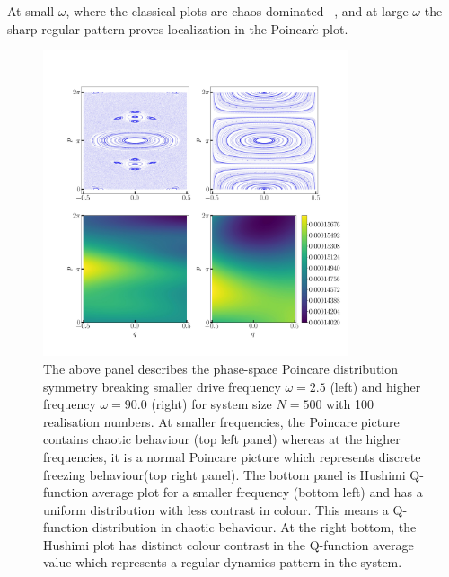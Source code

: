 \documentclass[%
reprint,
superscriptaddress,
amsmath,amssymb,
aps,
prb,
]{revtex4-2}
\begin{document}
	At small $\omega$, where the classical plots are chaos dominated ~\cite{Kidd2019}, and at large $\omega$ the sharp regular pattern proves localization in the Poincar$\acute{e}$ plot. 
	\begin{figure}[ht!]
		\centering
		\includegraphics[height = 9.0cm, width = 9.0 cm]{lmg_poincare.jpeg}
		\caption{The above panel describes the phase-space Poincare distribution symmetry breaking smaller drive frequency $\omega = 2.5$ (left) and higher frequency $\omega = 90.0$ (right) for system size $N=500$ with 100 realisation numbers. At smaller frequencies, the Poincare picture contains chaotic behaviour (top left panel) whereas at the higher frequencies, it is a normal Poincare picture which represents discrete freezing behaviour(top right panel). The bottom panel is Hushimi Q-function average plot for  a smaller frequency (bottom left) and has a uniform distribution with less contrast in colour. This means a Q-function distribution in chaotic behaviour. At the right bottom, the Hushimi plot has distinct colour contrast in the Q-function average value which represents a regular dynamics pattern in the system.}
		\label{fig:classical_lipkin}
	\end{figure}
\end{document}
